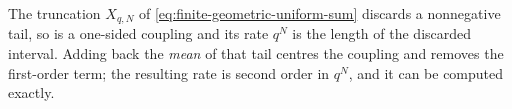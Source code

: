 \documentclass[11pt,a4paper,oneside,openany]{book}
\theoremstyle{definition}
\theoremstyle{remark}
\begin{document}

The truncation $X_{q,N}$ of \eqref{eq:finite-geometric-uniform-sum} discards a
nonnegative tail, so  is a one-sided
coupling and its rate $q^N$ is the length of the discarded interval.  Adding back
the \emph{mean} of that tail centres the coupling and removes the first-order
term; the resulting rate is second order in $q^N$, and it can be computed
exactly.
\end{document}
